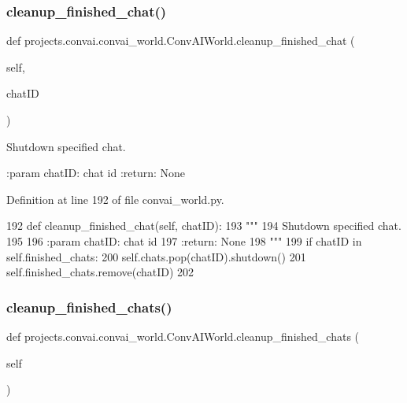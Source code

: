 \subsubsection{\texorpdfstring{cleanup\+\_\+finished\+\_\+chat()}{cleanup\_finished\_chat()}}
{\footnotesize\ttfamily def projects.\+convai.\+convai\+\_\+world.\+Conv\+A\+I\+World.\+cleanup\+\_\+finished\+\_\+chat (\begin{DoxyParamCaption}\item[{}]{self,  }\item[{}]{chat\+ID }\end{DoxyParamCaption})}

\begin{DoxyVerb}Shutdown specified chat.

:param chatID: chat id
:return: None
\end{DoxyVerb}
 

Definition at line 192 of file convai\+\_\+world.\+py.


\begin{DoxyCode}
192     \textcolor{keyword}{def }cleanup\_finished\_chat(self, chatID):
193         \textcolor{stringliteral}{"""}
194 \textcolor{stringliteral}{        Shutdown specified chat.}
195 \textcolor{stringliteral}{}
196 \textcolor{stringliteral}{        :param chatID: chat id}
197 \textcolor{stringliteral}{        :return: None}
198 \textcolor{stringliteral}{        """}
199         \textcolor{keywordflow}{if} chatID \textcolor{keywordflow}{in} self.finished\_chats:
200             self.chats.pop(chatID).shutdown()
201             self.finished\_chats.remove(chatID)
202 
\end{DoxyCode}
\mbox{\label{classprojects_1_1convai_1_1convai__world_1_1ConvAIWorld_a76d9656d3eb3a2a6646d61af69044be1}} 
\subsubsection{\texorpdfstring{cleanup\+\_\+finished\+\_\+chats()}{cleanup\_finished\_chats()}}
{\footnotesize\ttfamily def projects.\+convai.\+convai\+\_\+world.\+Conv\+A\+I\+World.\+cleanup\+\_\+finished\+\_\+chats (\begin{DoxyParamCaption}\item[{}]{self }\end{DoxyParamCaption})}

